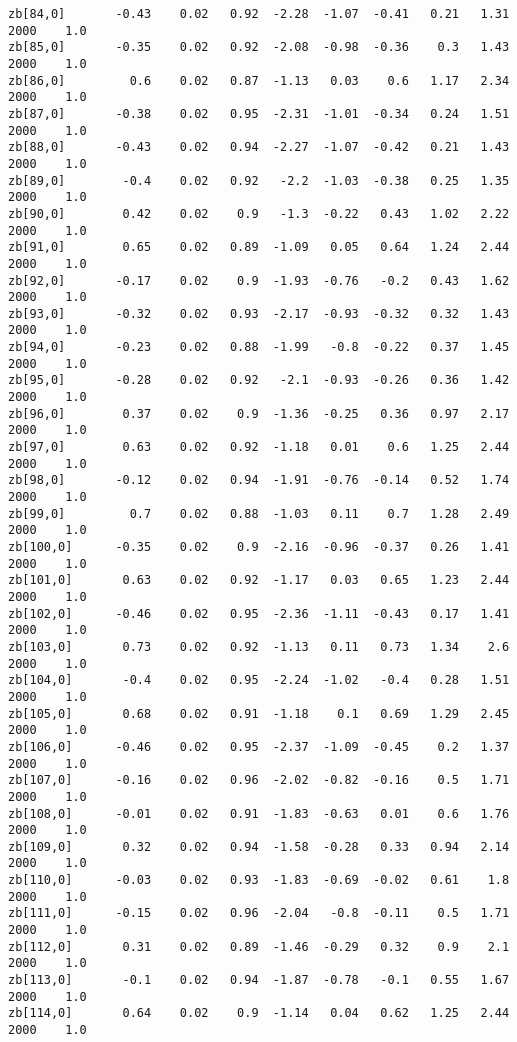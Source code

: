 \documentclass[11pt]{article}
\begin{document}
\begin{Verbatim}[commandchars=\\\{\}]
zb[84,0]       -0.43    0.02   0.92  -2.28  -1.07  -0.41   0.21   1.31   2000    1.0
zb[85,0]       -0.35    0.02   0.92  -2.08  -0.98  -0.36    0.3   1.43   2000    1.0
zb[86,0]         0.6    0.02   0.87  -1.13   0.03    0.6   1.17   2.34   2000    1.0
zb[87,0]       -0.38    0.02   0.95  -2.31  -1.01  -0.34   0.24   1.51   2000    1.0
zb[88,0]       -0.43    0.02   0.94  -2.27  -1.07  -0.42   0.21   1.43   2000    1.0
zb[89,0]        -0.4    0.02   0.92   -2.2  -1.03  -0.38   0.25   1.35   2000    1.0
zb[90,0]        0.42    0.02    0.9   -1.3  -0.22   0.43   1.02   2.22   2000    1.0
zb[91,0]        0.65    0.02   0.89  -1.09   0.05   0.64   1.24   2.44   2000    1.0
zb[92,0]       -0.17    0.02    0.9  -1.93  -0.76   -0.2   0.43   1.62   2000    1.0
zb[93,0]       -0.32    0.02   0.93  -2.17  -0.93  -0.32   0.32   1.43   2000    1.0
zb[94,0]       -0.23    0.02   0.88  -1.99   -0.8  -0.22   0.37   1.45   2000    1.0
zb[95,0]       -0.28    0.02   0.92   -2.1  -0.93  -0.26   0.36   1.42   2000    1.0
zb[96,0]        0.37    0.02    0.9  -1.36  -0.25   0.36   0.97   2.17   2000    1.0
zb[97,0]        0.63    0.02   0.92  -1.18   0.01    0.6   1.25   2.44   2000    1.0
zb[98,0]       -0.12    0.02   0.94  -1.91  -0.76  -0.14   0.52   1.74   2000    1.0
zb[99,0]         0.7    0.02   0.88  -1.03   0.11    0.7   1.28   2.49   2000    1.0
zb[100,0]      -0.35    0.02    0.9  -2.16  -0.96  -0.37   0.26   1.41   2000    1.0
zb[101,0]       0.63    0.02   0.92  -1.17   0.03   0.65   1.23   2.44   2000    1.0
zb[102,0]      -0.46    0.02   0.95  -2.36  -1.11  -0.43   0.17   1.41   2000    1.0
zb[103,0]       0.73    0.02   0.92  -1.13   0.11   0.73   1.34    2.6   2000    1.0
zb[104,0]       -0.4    0.02   0.95  -2.24  -1.02   -0.4   0.28   1.51   2000    1.0
zb[105,0]       0.68    0.02   0.91  -1.18    0.1   0.69   1.29   2.45   2000    1.0
zb[106,0]      -0.46    0.02   0.95  -2.37  -1.09  -0.45    0.2   1.37   2000    1.0
zb[107,0]      -0.16    0.02   0.96  -2.02  -0.82  -0.16    0.5   1.71   2000    1.0
zb[108,0]      -0.01    0.02   0.91  -1.83  -0.63   0.01    0.6   1.76   2000    1.0
zb[109,0]       0.32    0.02   0.94  -1.58  -0.28   0.33   0.94   2.14   2000    1.0
zb[110,0]      -0.03    0.02   0.93  -1.83  -0.69  -0.02   0.61    1.8   2000    1.0
zb[111,0]      -0.15    0.02   0.96  -2.04   -0.8  -0.11    0.5   1.71   2000    1.0
zb[112,0]       0.31    0.02   0.89  -1.46  -0.29   0.32    0.9    2.1   2000    1.0
zb[113,0]       -0.1    0.02   0.94  -1.87  -0.78   -0.1   0.55   1.67   2000    1.0
zb[114,0]       0.64    0.02    0.9  -1.14   0.04   0.62   1.25   2.44   2000    1.0

\end{Verbatim}
\end{document}
